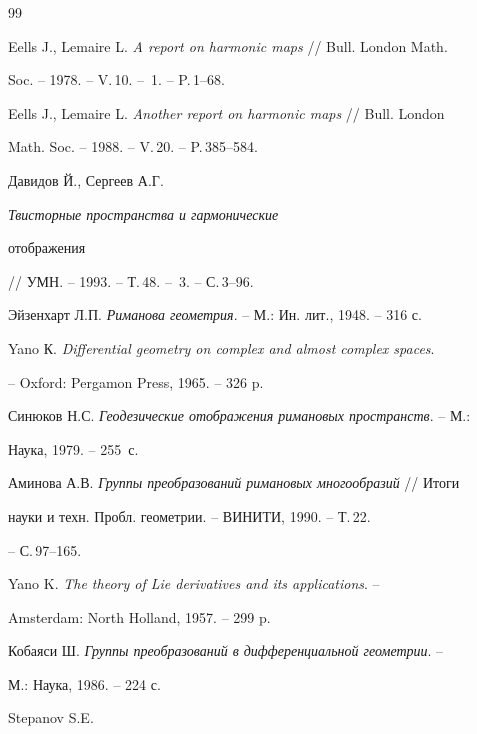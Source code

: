 \begin{thebibliography}{99} 


 




Eells J., Lemaire L. {\em A report on harmonic maps} // Bull. London Math. 


Soc. -- 1978. -- V.\,10. -- \No\,1. -- P.\,1--68. 




Eells J., Lemaire L. {\em Another report on harmonic maps} // Bull. London 


Math. Soc. -- 1988. -- V.\,20. -- P.\,385--584. 




Давидов Й., Сергеев А.Г. {\em Твисторные пространства и гармонические 


отображения} // УМН. -- 1993. -- Т.\,48. -- \No\,3. -- С.\,3--96. 




Эйзенхарт Л.П. {\em Риманова геометрия}. -- М.: Ин. лит., 1948. -- 316 с. 




Yano К. {\em Differential geometry on complex and almost complex spaces}. 


-- Oxford: Pergamon Press, 1965. -- 326 p. 




Синюков Н.С. {\em Геодезические отображения римановых пространств}. -- М.: 


Наука, 1979. -- 255~с. 




Аминова А.В. {\em Группы преобразований римановых многообразий} // Итоги 


науки и техн. Пробл. геометрии. -- ВИНИТИ, 1990. -- Т.\,22. 


-- С.\,97--165. 




Yano K. {\em The theory of Lie derivatives and its applications}. -- 


Amsterdam: North Holland, 1957. -- 299 p. 




Кобаяси Ш. {\em Группы преобразований в дифференциальной геометрии}. -- 


М.: Наука, 1986. -- 224 с. 




Stepanov S.E. 



\end{thebibliography}
